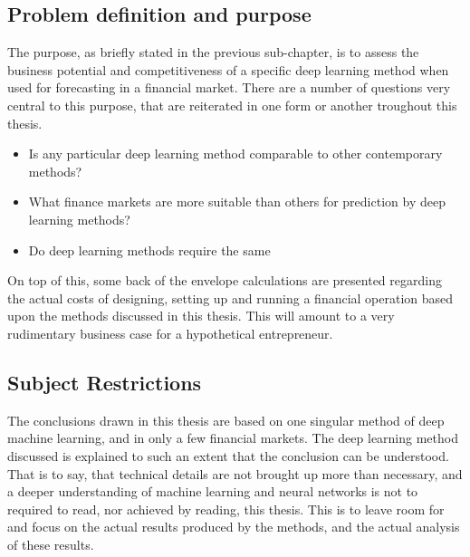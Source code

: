 \subsection{Problem definition and purpose}

The purpose, as briefly stated in the previous sub-chapter, is to assess the business potential and competitiveness of a specific deep learning method when used for forecasting in a financial market. There are a number of questions very central to this purpose, that are reiterated in one form or another troughout this thesis.

\begin{itemize}

\item Is any particular deep learning method comparable to other contemporary methods?

\item What finance markets are more suitable than others for prediction by deep learning methods?

\item Do deep learning methods require the same 

\end{itemize}

On top of this, some back of the envelope calculations are presented regarding the actual costs of designing, setting up and running a financial operation based upon the methods discussed in this thesis. This will amount to a very rudimentary business case for a hypothetical entrepreneur.




\subsection{Subject Restrictions}

The conclusions drawn in this thesis are based on one singular method of deep machine learning, and in only a few financial markets. The deep learning method discussed is explained to such an extent that the conclusion can be understood. That is to say, that technical details are not brought up more than necessary, and a deeper understanding of machine learning and neural networks is not to required to read, nor achieved by reading, this thesis. This is to leave room for and focus on the actual results produced by the methods, and the actual analysis of these results.

